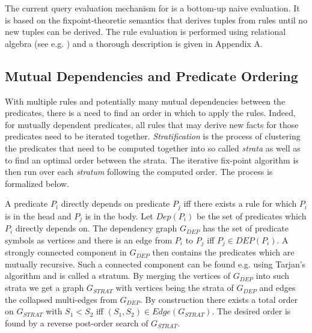 \newcommand{\sigmatwo}{\overline{\sigma}}
The current query evaluation mechanism for \datalogM is a bottom-up naive\cite{Green:2013:DRQ:2688167.2688168} evaluation. It is based on the fixpoint-theoretic semantics that derives tuples from rules until no new tuples can be derived. The rule evaluation is performed using relational algebra (see e.g. \cite{Abiteboul:1995:FDL:551350}) and a thorough description is given in Appendix A.

\subsection{Mutual Dependencies and Predicate Ordering}
With multiple rules and potentially many mutual dependencies between the predicates, there is a need to find an order in which to apply the rules. Indeed, for mutually dependent predicates, all rules that may derive new facts for those predicates need to be iterated together. \textit{Stratification}\cite{Green:2013:DRQ:2688167.2688168} is the process of clustering the predicates that need to be computed together into so called \textit{strata} as well as to find an optimal order between the strata. The iterative fix-point algorithm is then run over each \textit{stratum} following the computed order. The process is formalized below.

A predicate $P_i$ directly depends on predicate $P_j$ iff there exists a rule for which $P_i$ is in the head and $P_j$ is in the body. Let $Dep(P_i)$ be the set of predicates which $P_i$ directly depends on. The dependency graph $G_{DEP}$ has the set of predicate symbols as vertices and there is an edge from $P_i$ to $P_j$ iff $P_j \in DEP(P_i)$. A strongly connected component in $G_{DEP}$ then contains the predicates which are mutually recursive. Such a connected component can be found e.g. using Tarjan's algorithm \cite{Tarjan72depthfirst} and is called a stratum. By merging the vertices of $G_{DEP}$ into such strata we get a graph $G_{STRAT}$ with vertices being the strata of $G_{DEP}$ and edges the collapsed multi-edges from $G_{DEP}$. By construction there exists a total order on $G_{STRAT}$ with $S_1 < S_2$ iff $(S_1, S_2) \in Edge(G_{STRAT})$. The desired order is found by a reverse post-order search of $G_{STRAT}$.
